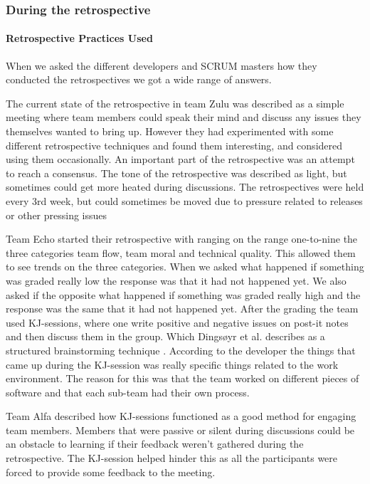 \label{question-3}

\subsubsection{During the retrospective}
\paragraph{Retrospective Practices Used}
When we asked the different developers and SCRUM masters how they conducted the retrospectives we got a wide range of answers. 

The current state of the retrospective in team Zulu was described as a simple meeting where team members could speak their mind and discuss any issues they themselves wanted to bring up. However they had experimented with some different retrospective techniques and found them interesting, and considered using them occasionally. An important part of the retrospective was an attempt to reach a consensus. The tone of the retrospective was described as light, but sometimes could get more heated during discussions. The retrospectives were held every 3rd week, but could sometimes be moved due to pressure related to releases or other pressing issues

Team Echo started their retrospective with ranging on the range one-to-nine the three categories team flow, team moral and technical quality. This allowed them to see trends on the three categories. When we asked what happened if something was graded really low the response was that it had not happened yet. We also asked if the opposite what happened if something was graded really high and the response was the same that it had not happened yet. After the grading the team used KJ-sessions, where one write positive and negative issues on post-it notes and then discuss them in the group. Which Dingsøyr et al. describes as a structured brainstorming technique \cite{Dingsoyr2003}. According to the developer the things that came up during the KJ-session was really specific things related to the work environment. The reason for this was that the team worked on different pieces of software and that each sub-team had their own process. 

Team Alfa described how KJ-sessions functioned as a good method for engaging team members. Members that were passive or silent during discussions could be an obstacle to learning if their feedback weren't gathered during the retrospective. The KJ-session helped hinder this as all the participants were forced to provide some feedback to the meeting.

